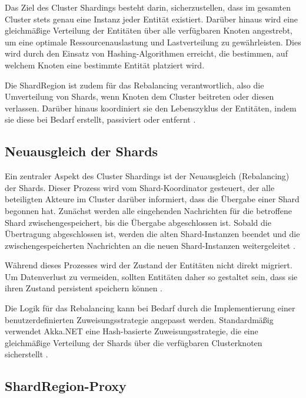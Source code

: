 Das Ziel des Cluster Shardings besteht darin, sicherzustellen, dass im gesamten Cluster stets genau eine Instanz jeder Entität existiert.  
Darüber hinaus wird eine gleichmäßige Verteilung der Entitäten über alle verfügbaren Knoten angestrebt, um eine optimale Ressourcenauslastung und Lastverteilung zu gewährleisten.  
Dies wird durch den Einsatz von Hashing-Algorithmen erreicht, die bestimmen, auf welchem Knoten eine bestimmte Entität platziert wird.  

Die ShardRegion ist zudem für das Rebalancing verantwortlich, also die Umverteilung von Shards, wenn Knoten dem Cluster beitreten oder diesen verlassen.  
Darüber hinaus koordiniert sie den Lebenszyklus der Entitäten, indem sie diese bei Bedarf erstellt, passiviert oder entfernt \parencite{cluster_sharding_petabridge}.

\subsection{Neuausgleich der Shards}

Ein zentraler Aspekt des Cluster Shardings ist der Neuausgleich (Rebalancing) der Shards.  
Dieser Prozess wird vom Shard-Koordinator gesteuert, der alle beteiligten Akteure im Cluster darüber informiert, dass die Übergabe einer Shard begonnen hat.  
Zunächst werden alle eingehenden Nachrichten für die betroffene Shard zwischengespeichert, bis die Übergabe abgeschlossen ist.  
Sobald die Übertragung abgeschlossen ist, werden die alten Shard-Instanzen beendet und die zwischengespeicherten Nachrichten an die neuen Shard-Instanzen weitergeleitet \parencite{cluster_sharding_petabridge}.  

Während dieses Prozesses wird der Zustand der Entitäten nicht direkt migriert.  
Um Datenverlust zu vermeiden, sollten Entitäten daher so gestaltet sein, dass sie ihren Zustand persistent speichern können \parencite{cluster_sharding_petabridge}.  

Die Logik für das Rebalancing kann bei Bedarf durch die Implementierung einer benutzerdefinierten Zuweisungsstrategie angepasst werden.  
Standardmäßig verwendet Akka.NET eine Hash-basierte Zuweisungsstrategie, die eine gleichmäßige Verteilung der Shards über die verfügbaren Clusterknoten sicherstellt \parencite{getakka_cluster_sharding}.

\subsection{ShardRegion-Proxy}


